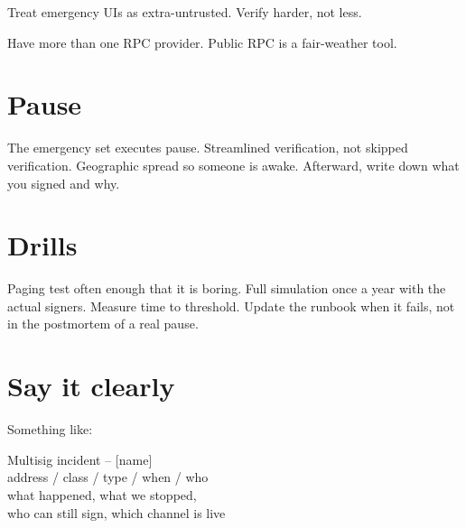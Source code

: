 Treat emergency UIs as extra-untrusted. Verify
harder, not less.

Have more than one RPC provider. Public RPC is a
fair-weather tool.

\section{Pause}

The emergency set executes pause. Streamlined
verification, not skipped verification. Geographic
spread so someone is awake. Afterward, write down
what you signed and why.

\section{Drills}

Paging test often enough that it is boring. Full
simulation once a year with the actual signers.
Measure time to threshold. Update the runbook
when it fails, not in the postmortem of a real
pause.

\section{Say it clearly}

Something like:

{\fontsize{8}{10}\selectfont\ttfamily
[URGENT] Multisig incident -- [name]\\
address / class / type / when / who\\
what happened, what we stopped,\\
who can still sign, which channel is live\par}
